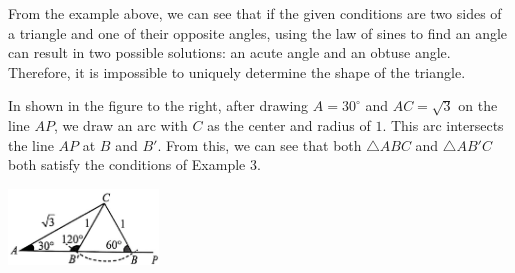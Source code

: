 \documentclass{report}
\begin{document}
\begin{vwcol}[widths={0.6,0.4}, sep=8mm, rule=0pt,justify=flushleft]
    From the example above, we can see that if the given conditions are two sides of a triangle and one of their opposite angles, using the law of sines to find an angle can result in two possible solutions: an acute angle and an obtuse angle. Therefore, it is impossible to uniquely determine the shape of the triangle.

    In shown in the figure to the right, after drawing $A=30^\circ$ and $AC=\sqrt{3}$ on the line $AP$, we draw an arc with $C$ as the center and radius of $1$. This arc intersects the line $AP$ at $B$ and $B'$. From this, we can see that both $\triangle ABC$ and $\triangle AB'C$ both satisfy the conditions of Example 3.

    \vspace{6em}

    \includegraphics[width=0.3\textwidth]{assets/10-8.jpg}
\end{vwcol}

\newpage
\end{document}
